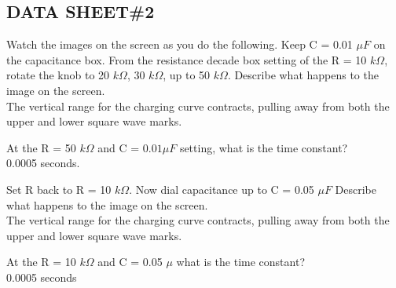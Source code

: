 \subsection{DATA SHEET\#2}
	\item Watch the images on the screen as you do the following.  Keep C = 0.01 $\mu F$ on the capacitance box.  From the resistance decade box setting of the R = 10 $k \Omega$, rotate the knob to 20 $k \Omega$, 30 $k \Omega$, up to 50 $k\Omega$.  Describe what happens to the image on the screen.\\
	
	The vertical range for the charging curve contracts, pulling away from both the upper and lower square wave marks.\\
	
	\item At the R = 50 $k\Omega$ and C = $0.01 \mu F$ setting, what is the time constant?\\
	
	0.0005 seconds.
	
	\item Set R back to R = 10 $k \Omega$.  Now dial capacitance up to C = 0.05 $\mu F$  Describe what happens to the image on the screen.\\
	
	The vertical range for the charging curve contracts, pulling away from both the upper and lower square wave marks.\\
	
	\item At the R = 10 $k \Omega$ and C = 0.05 $\mu $ what is the time constant? \\
	
	0.0005 seconds
	
